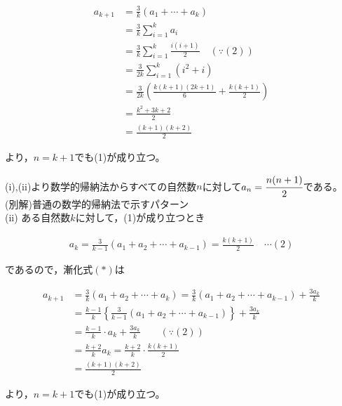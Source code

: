 \documentclass[autodetect-engine,ja=standard, 10.5pt, a4paper, titlepage]{bxjsarticle}
\begin{document}
\begin{enumerate}[1.]
\begin{enumerate}[(1)]
\begin{enumerate}[(i)]
\begin{fleqn}[20pt]
                      \begin{align*}
                        a_{k+1}
                        &= \frac{3}{k}(a_1 + \cdots + a_k) \\
                        &= \frac{3}{k}\sum_{i=1}^{k}a_i \\
                        &= \frac{3}{k}\sum_{i=1}^{k}\frac{i(i+1)}{2} \quad (\because (2))\\
                        &= \frac{3}{2k}\sum_{i=1}^{k}(i^2 + i) \\
                        &= \frac{3}{2k}\left( \frac{k(k+1)(2k+1)}{6} + \frac{k(k+1)}{2} \right) \\
                        &= \frac{k^2+3k+2}{2} \\
                        &= \frac{(k+1)(k+2)}{2}
                      \end{align*}
                    \end{fleqn}
                  より，$n = k + 1$でも(1)が成り立つ。

            (i),(ii)より数学的帰納法からすべての自然数$n$に対して$a_n = \cfrac{n(n+1)}{2}$である。
          \baselineskip
            \noindent(別解)普通の数学的帰納法で示すパターン\\
            (ii)\:\: ある自然数$k$に対して，(1)が成り立つとき
              \begin{fleqn}[20pt]
                \begin{align*}
                  a_k = \frac{3}{k-1}(a_1 + a_2 + \cdots + a_{k-1}) = \frac{k(k+1)}{2} \quad \cdots (2)
                \end{align*}
              \end{fleqn}
            であるので，漸化式$(*)$は
              \begin{fleqn}[20pt]
                \begin{align*}
                  a_{k+1}
                  &= \frac{3}{k}(a_1 + a_2 + \cdots + a_k) = \frac{3}{k}(a_1 + a_2 + \cdots + a_{k-1}) + \frac{3a_k}{k} \\
                  &= \frac{k-1}{k}\left\{ \frac{3}{k-1}(a_1 + a_2 + \cdots + a_{k-1}) \right\} + \frac{3a_k}{k} \\
                  &= \frac{k-1}{k}\cdot a_k + \frac{3a_k}{k} \qquad (\because (2))\\
                  &= \frac{k+2}{k}a_k = \frac{k+2}{k}\cdot \frac{k(k+1)}{2} \\
                  &= \frac{(k+1)(k+2)}{2}
                \end{align*}
              \end{fleqn}
            より，$n = k + 1$でも(1)が成り立つ。


\end{enumerate}
\end{enumerate}
\end{enumerate}
\end{document}

